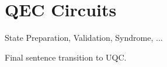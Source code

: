 \section{QEC Circuits}\label{sec:qec-circuits}

State Preparation, Validation, Syndrome, ...

Final sentence transition to UQC.